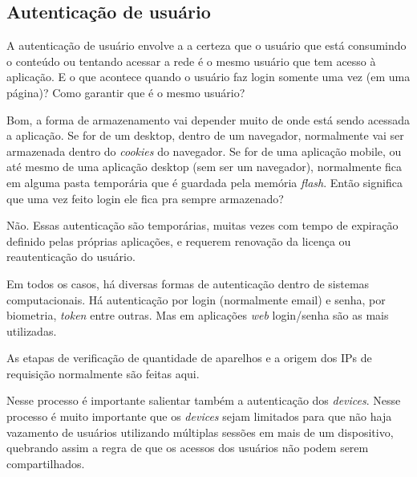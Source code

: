 \subsection{Autentica\c{c}\~ao de usu\'ario}
\label{subsection:autenticacao_usuario}
A autentica\c{c}\~ao de usu\'ario envolve a a certeza que o usu\'ario que est\'a consumindo o conte\'udo ou tentando acessar a rede \'e o mesmo usu\'ario que tem acesso \`a aplica\c{c}\~ao. E o que acontece quando o usu\'ario faz login somente uma vez (em uma p\'agina)? Como garantir que \'e o mesmo usu\'ario?

Bom, a forma de armazenamento vai depender muito de onde est\'a sendo acessada a aplica\c{c}\~ao. Se for de um desktop, dentro de um navegador, normalmente vai ser armazenada dentro do \textit{cookies} do navegador. Se for de uma aplica\c{c}\~ao mobile, ou at\'e mesmo de uma aplica\c{c}\~ao desktop (sem ser um navegador), normalmente fica em alguma pasta tempor\'aria que \'e guardada pela mem\'oria \textit{flash}. Ent\~ao significa que uma vez feito login ele fica pra sempre armazenado?

N\~ao. Essas autentica\c{c}\~ao s\~ao tempor\'arias, muitas vezes com tempo de expira\c{c}\~ao definido pelas pr\'oprias aplica\c{c}\~oes, e requerem renova\c{c}\~ao da licen\c{c}a ou reautentica\c{c}\~ao do usu\'ario. 

Em todos os casos, h\'a diversas formas de autentica\c{c}\~ao dentro de sistemas computacionais. H\'a autentica\c{c}\~ao por login (normalmente email) e senha, por biometria, \textit{token} entre outras. Mas em aplica\c{c}\~oes \textit{web} login/senha s\~ao as mais utilizadas.

As etapas de verifica\c{c}\~ao de quantidade de aparelhos e a origem dos IPs de requisi\c{c}\~ao normalmente s\~ao feitas aqui.

Nesse processo \'e importante salientar tamb\'em a autentica\c{c}\~ao dos \textit{devices}. Nesse processo \'e muito importante que os \textit{devices} sejam limitados para que n\~ao haja vazamento de usu\'arios utilizando m\'ultiplas sess\~oes em mais de um dispositivo, quebrando assim a regra de que os acessos dos usu\'arios n\~ao podem serem compartilhados.

